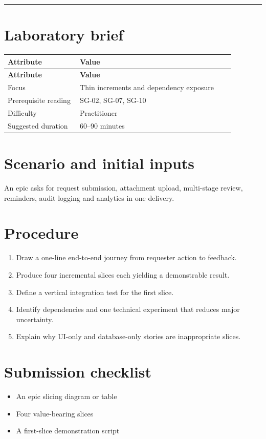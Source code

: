 \documentclass[11pt,letterpaper]{article}
\begin{document}
\tableofcontents\medskip\noindent\rule{\linewidth}{0.4pt}\medskip
\section{Laboratory brief}
\begin{longtable}{|p{0.28\linewidth}|p{0.60\linewidth}|}\hline
\textbf{Attribute} & \textbf{Value} \\ \hline\endfirsthead\hline
\textbf{Attribute} & \textbf{Value} \\ \hline\endhead
Focus & Thin increments and dependency exposure \\ \hline
Prerequisite reading & SG-02, SG-07, SG-10 \\ \hline
Difficulty & Practitioner \\ \hline
Suggested duration & 60–90 minutes \\ \hline
\end{longtable}
\section{Scenario and initial inputs}
An epic asks for request submission, attachment upload, multi-stage review, reminders, audit logging and analytics in one delivery.

\section{Procedure}
\begin{enumerate}[leftmargin=*,itemsep=3pt]
\item Draw a one-line end-to-end journey from requester action to feedback.
\item Produce four incremental slices each yielding a demonstrable result.
\item Define a vertical integration test for the first slice.
\item Identify dependencies and one technical experiment that reduces major uncertainty.
\item Explain why UI-only and database-only stories are inappropriate slices.
\end{enumerate}
\section{Submission checklist}
\begin{itemize}[leftmargin=*,itemsep=2pt]
\item An epic slicing diagram or table
\item Four value-bearing slices
\item A first-slice demonstration script
\end{itemize}
\end{document}
